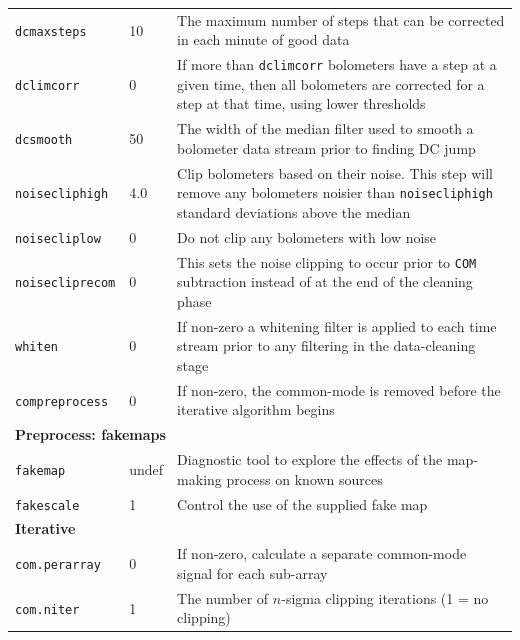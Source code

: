 \documentclass[twoside,11pt]{article}
\renewcommand{\_}{\texttt{\symbol{95}}}
\newcommand{\param}[1]{\texttt{#1}}
\newcommand{\model}[1]{\texttt{#1}}
\begin{document}
\begin{htmlonly}
\begin{table}
\begin{center}
\begin{small}
\begin{tabular}{|p{2.2cm}|p{1.1cm}|p{11.4cm}|}
\param{dcmaxsteps}    &   10 & The maximum number of steps that can be corrected
                               in each minute of good data \\
\param{dclimcorr}     &    0 & If more than \param{dclimcorr} bolometers have a step
                               at a given time, then all bolometers are corrected
                               for a step at that time, using lower thresholds \\
\param{dcsmooth}      &   50 & The width of the median filter used to smooth a
                               bolometer data stream prior to finding DC jump \\
\param{noisecliphigh} &  4.0 & Clip bolometers based on their noise. This step
                               will remove any bolometers noisier than
                               \param{noisecliphigh} standard deviations above the
                               median \\
\param{noisecliplow}   &   0 & Do not clip any bolometers with low noise \\
\param{noisecliprecom} &   0 & This sets the noise clipping to occur prior to
                               \model{COM} subtraction instead of at the end of
                               the cleaning phase \\
\param{whiten}         &   0 & If non-zero a whitening filter is applied to each
                               time stream prior to any filtering in the
                               data-cleaning stage \\
\param{compreprocess}  &   0 & If non-zero, the common-mode is removed before the
                               iterative algorithm begins \\
\hline
\multicolumn{3}{|l|}{\textbf{Preprocess: fakemaps}}\\
\hline
\param{fakemap}         & undef & Diagnostic tool to explore the effects of the
                                  map-making process on known sources \\
\param{fakescale}       &     1 & Control the use of the supplied fake map \\
\hline
\multicolumn{3}{|l|}{\textbf{Iterative}}\\
\hline
\param{com.perarray}     &      0 & If non-zero, calculate a separate common-mode
                                    signal for each sub-array \\
\param{com.niter}        &      1 & The number of $n$-sigma clipping iterations
                                    (1 = no clipping) \\

\end{tabular}
\end{small}
\end{center}
\end{table}
\end{htmlonly}
\end{document}
